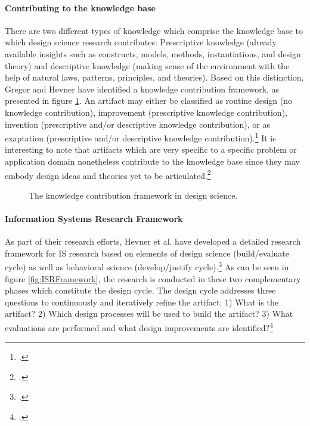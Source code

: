 \paragraph{Contributing to the knowledge base} There are two different types of knowledge which comprise the knowledge base to which design science research contributes: Prescriptive knowledge (already available insights such as constructs, models, methods, instantiations, and design theory) and descriptive knowledge (making sense of the environment with the help of natural laws, patterns, principles, and theories). Based on this distinction, Gregor and Hevner have identified a knowledge contribution framework, as presented in figure \ref{fig:DSRKnowledgeContribution}. An artifact may either be classified as routine design (no knowledge contribution), improvement (prescriptive knowledge contribution), invention (prescriptive and/or descriptive knowledge contribution), or as exaptation (prescriptive and/or descriptive knowledge contribution).\footcite[Cf.][p.344 et seqq]{GregorPositioningpresentingdesign2013} It is interesting to note that artifacts which are very specific to a specific problem or application domain nonetheless contribute to the knowledge base since they may embody design ideas and theories yet to be articulated.\footcite[Cf.][p.340]{GregorPositioningpresentingdesign2013}

\begin{figure}
    \centering
    
    \caption[The knowledge contribution framework in design science.]{The knowledge contribution framework in design science.\protect\footnotemark}
    \label{fig:DSRKnowledgeContribution}
\end{figure}


\paragraph{Information Systems Research Framework}  \label{topic:design cycle}
As part of their research efforts, Hevner et al. have developed a detailed research framework for \ac{IS} research based on elements of design science (build/evaluate cycle) as well as behavioral science (develop/justify cycle).\footcite[Cf.][p.80 et seqq]{HevnerDesignScienceResearch2004}
As can be seen in figure \ref{fig:ISRFramework}, the research is conducted in these two complementary phases which constitute the design cycle. The design cycle addresses three questions to continuously and iteratively refine the artifact: 1) What is the artifact? 2) Which design processes will be used to build the artifact? 3) What evaluations are performed and what design improvements are identified?\footcites[Cf.][p.19]{HevnerDesignResearchInformation2010}[cf.][p.90]{Hevnerthreecycleview2007}[cf.][p.89]{Hevnerthreecycleview2007}

